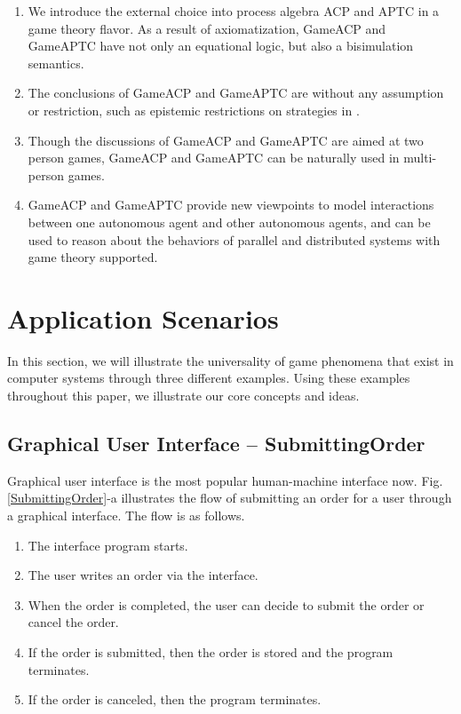 \documentclass{fac}
\begin{document}
\begin{enumerate}
  \item We introduce the external choice into process algebra ACP and APTC in a game theory flavor. As a result of axiomatization, GameACP and GameAPTC have not only an equational logic, but also a bisimulation semantics.
  \item The conclusions of GameACP and GameAPTC are without any assumption or restriction, such as epistemic restrictions on strategies in \cite{GameProcess}.
  \item Though the discussions of GameACP and GameAPTC are aimed at two person games, GameACP and GameAPTC can be naturally used in multi-person games.
  \item GameACP and GameAPTC provide new viewpoints to model interactions between one autonomous agent and other autonomous agents, and can be used to reason about the behaviors of parallel and distributed systems with game theory supported.
\end{enumerate}

\section{Application Scenarios}\label{AS}

In this section, we will illustrate the universality of game phenomena that exist in computer systems through three different examples. Using these examples throughout this paper, we illustrate our core concepts and ideas.

\subsection{Graphical User Interface -- SubmittingOrder}

Graphical user interface is the most popular human-machine interface now. Fig. \ref{SubmittingOrder}-a illustrates the flow of submitting an order for a user through a graphical interface. The flow is as follows.

\begin{enumerate}
  \item The interface program starts.
  \item The user writes an order via the interface.
  \item When the order is completed, the user can decide to submit the order or cancel the order.
  \item If the order is submitted, then the order is stored and the program terminates.
  \item If the order is canceled, then the program terminates.
\end{enumerate}
\end{document}
